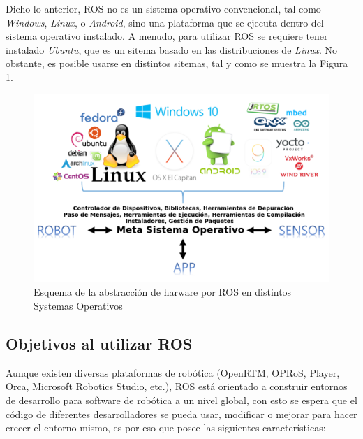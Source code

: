Dicho lo anterior, ROS no es un sistema operativo convencional, tal como \textit{Windows}, \textit{Linux}, o \textit{Android}, sino una plataforma que se ejecuta dentro del sistema operativo instalado. A menudo, para utilizar ROS se requiere tener instalado \textit{Ubuntu}, que es un sitema basado en las distribuciones de \textit{Linux}. No obstante, es posible usarse en distintos sitemas, tal y como se muestra la Figura \ref{fig:meta_operating_system}. 
\begin{figure}
\centering
\includegraphics[scale=0.5]{images/meta_operating_system.png}
\caption{Esquema de la abstracción de harware por ROS en distintos Systemas Operativos}
\label{fig:meta_operating_system}
\end{figure} 

		\subsection*{Objetivos al utilizar ROS}
Aunque existen diversas plataformas de robótica (OpenRTM, OPRoS, Player, Orca, Microsoft Robotics Studio, etc.), ROS está orientado a construir entornos de desarrollo para software de robótica a un nivel global, con esto se espera que el código de diferentes desarrolladores se pueda usar, modificar o mejorar para hacer crecer el entorno mismo, es por eso que posee las siguientes características:

